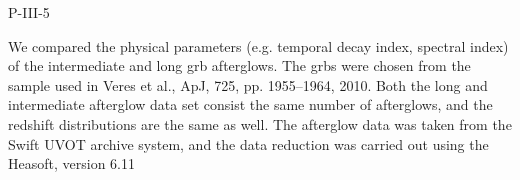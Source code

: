 P-III-5


\bigskip



\bigskip

\noindent We compared the physical parameters (e.g. temporal decay index, spectral index) of the intermediate and long grb afterglows. 
The grbs were chosen from the sample used in Veres et al., ApJ, 725, pp. 1955–1964, 2010.
Both the long and intermediate afterglow data set consist the same number of afterglows,
and the redshift distributions are the same as well.
The afterglow data was taken from the Swift UVOT archive system, and the
data reduction was carried out using the Heasoft, version 6.11
